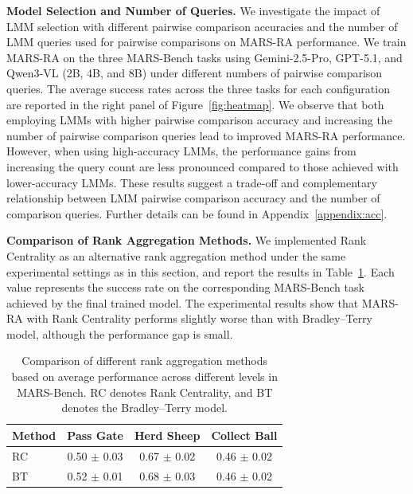 \documentclass[11pt]{article}
\begin{document}
\noindent \textbf{Model Selection and Number of Queries.} We investigate the impact of LMM selection with different pairwise comparison accuracies and the number of LMM queries used for pairwise comparisons on MARS-RA performance. We train MARS-RA on the three MARS-Bench tasks using Gemini-2.5-Pro, GPT-5.1, and Qwen3-VL (2B, 4B, and 8B) under different numbers of pairwise comparison queries. The average success rates across the three tasks for each configuration are reported in the right panel of Figure~\ref{fig:heatmap}. We observe that both employing LMMs with higher pairwise comparison accuracy and increasing the number of pairwise comparison queries lead to improved MARS-RA performance. However, when using high-accuracy LMMs, the performance gains from increasing the query count are less pronounced compared to those achieved with lower-accuracy LMMs. These results suggest a trade-off and complementary relationship between LMM pairwise comparison accuracy and the number of comparison queries. Further details can be found in Appendix~\ref{appendix:acc}.

%

\noindent \textbf{Comparison of Rank Aggregation Methods.} We implemented Rank Centrality \cite{negahban2012iterative} as an alternative rank aggregation method under the same experimental settings as in this section, and report the results in Table~\ref{tab:rank_aggregation}. Each value represents the success rate on the corresponding MARS-Bench task achieved by the final trained model. The experimental results show that MARS-RA with Rank Centrality performs slightly worse than with Bradley--Terry model, although the performance gap is small.

\begin{table}[t]
\centering

\setlength{\tabcolsep}{0.8mm}
\begin{tabular}{lccc}
\toprule
Method & Pass Gate & Herd Sheep & Collect Ball \\
\midrule
RC & 0.50 $\pm$ 0.03 & 0.67 $\pm$ 0.02 & 0.46 $\pm$ 0.02 \\
BT              & 0.52 $\pm$ 0.01 & 0.68 $\pm$ 0.03 & 0.46 $\pm$ 0.02 \\
\bottomrule
\end{tabular}
\caption{Comparison of different rank aggregation methods based on average performance across different levels in MARS-Bench. RC denotes Rank Centrality, and BT denotes the Bradley--Terry model.}
\label{tab:rank_aggregation}
\end{table}
\end{document}
